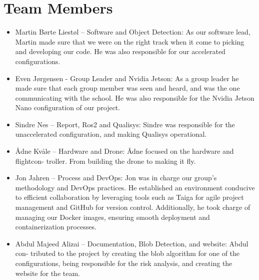 \section{Team Members}


\begin{itemize}
\item Martin Børte Liestøl – Software and Object Detection: As our software lead, Martin
made sure that we were on the right track when it come to picking and developing
our code. He was also responsible for our accelerated configurations.

\item Even Jørgensen - Group Leader and Nvidia Jetson: As a group leader he made sure
that each group member was seen and heard, and was the one communicating with
the school. He was also responsible for the Nvidia Jetson Nano configuration of our
project.

\item Sindre Nes – Report, Ros2 and Qualisys: Sindre was responsible for the unaccelerated configuration, and making Qualisys operational.

\item Ådne Kvåle – Hardware and Drone: Ådne focused on the hardware and flightcon-
troller. From building the drone to making it fly.

\item Jon Jahren – Process and DevOps: Jon was in charge our group’s
methodology and DevOps practices. He established an environment conducive to
eﬀicient collaboration by leveraging tools such as Taiga for agile project management
and GitHub for version control. Additionally, he took charge of managing our
Docker images, ensuring smooth deployment and containerization processes.

\item Abdul Majeed Alizai – Documentation, Blob Detection, and website: Abdul con-
tributed to the project by creating the blob algorithm for one of the configurations,
being responsible for the risk analysis, and creating the website for the team.
\end{itemize}